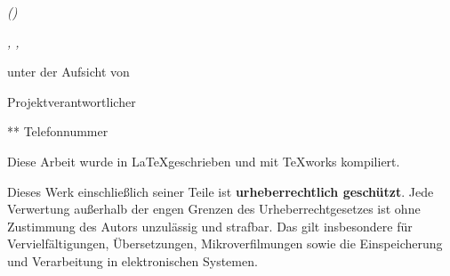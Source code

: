 \begin{titlepage}	
\centering	
{\LARGE \auditCommittee \par}
\vspace{1cm}
{\Large \mainTitle \par}
\vspace{1.5cm}
{\huge\bfseries \projectTitleLong \par}
\vspace{1cm}
{\Large\itshape \authorName \par}
\vspace{1cm}
{\Large\bfseries \apprenticeship \par}
\vspace{1cm}
{\Large\itshape \companyNameLong (\companyNameShort) \par}
\vspace{1cm}
{\large\itshape \companyLocationStreet \companyLocationNumber, \companyLocationPostcode \companyLocationCity, \companyLocationState \par}

\vfill
unter der Aufsicht von \par
Projektverantwortlicher \projectManager \par
**  Telefonnummer
\vfill		
{\large \dateOfCreation \par}
\vspace{1cm}
\small 
Diese Arbeit wurde in \LaTeX  geschrieben und mit TeXworks kompiliert. \\ %
\small
\noindent
\begin{justify}
	Dieses Werk einschließlich seiner Teile ist \textbf{urheberrechtlich geschützt}.
	Jede Verwertung außerhalb der engen Grenzen des Urheberrechtgesetzes ist ohne
	Zustimmung des Autors unzulässig und strafbar. Das gilt insbesondere für
	Vervielfältigungen, Übersetzungen, Mikroverfilmungen sowie die Einspeicherung
	und Verarbeitung in elektronischen Systemen.
\end{justify}

\end{titlepage}